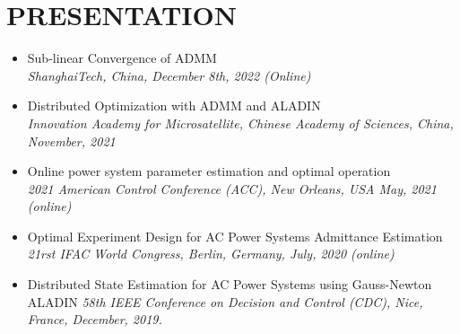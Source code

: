 \documentclass[paper=a4,fontsize=11pt]{scrartcl} %
\newcommand{\NewPart}[1]{\section*{\uppercase{#1}}}
\begin{document}
			\NewPart{PRESENTATION}{}
			\begin{itemize}
				\item {
					{Sub-linear Convergence of ADMM}\\
					\emph{ShanghaiTech, China, December 8th, 2022 (Online)	} }
				
				
				\item  {
					{Distributed Optimization with ADMM and	ALADIN}\\
					\emph{Innovation Academy for Microsatellite, Chinese Academy of Sciences, China, November, 2021 	} }
				\item  {
					{Online power system parameter estimation and optimal operation}\\
					\emph{2021 American Control Conference (ACC), New Orleans, USA May, 2021 (online)
				} }
				
				\item  {
					Optimal Experiment Design for AC Power Systems Admittance Estimation\\
					\emph{21rst IFAC World Congress, Berlin, Germany, July, 2020 (online)
				} }
				
				\item  {
					Distributed State Estimation for AC Power Systems using Gauss-Newton ALADIN 
					\emph{58th IEEE Conference on Decision and Control (CDC),
						Nice, France, December, 2019.} }
			\end{itemize}
			
\end{document}
